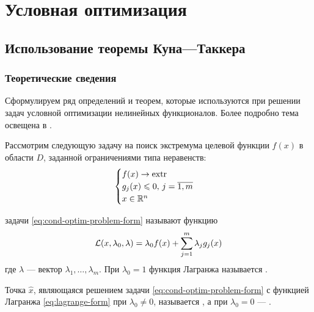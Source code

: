 \section{Условная оптимизация}

\subsection{Использование теоремы Куна—Таккера}
\label{sec:kuhn-tucker}

\subsubsection{Теоретические сведения}

Сформулируем ряд определений и теорем, которые используются при
решении задач условной оптимизации нелинейных функционалов. Более
подробно тема освещена в \cite{alekseev05}.

Рассмотрим следующую задачу на поиск экстремума целевой функции $f(x)$
в области $D$, заданной ограничениями типа неравенств:
\begin{equation}
  \label{eq:cond-optim-problem-form}
  \begin{cases}
    f(x) \to \operatorname{extr} \\
    g_j(x) \leqslant 0,\, j=\overline{1,m} \\
    x \in \mathbb{R}^n
  \end{cases}
\end{equation}

\begin{dfn}  задачи
  \eqref{eq:cond-optim-problem-form} называют функцию
  \begin{equation}
    \label{eq:lagrange-form}
    \mathcal{L}(x, \lambda_0, \lambda) = \lambda_0 f(x) + \sum_{j=1}^m {\lambda_j g_j(x)}
  \end{equation}
  где $\lambda$ — вектор $\lambda_1, \dotsc, \lambda_m$. При
  $\lambda_0=1$ функция Лагранжа называется .
\end{dfn}

\begin{dfn}
  \label{dfn:regular}
  Точка $\hat{x}$, являющаяся решением задачи
  \eqref{eq:cond-optim-problem-form} с функцией Лагранжа
  \eqref{eq:lagrange-form} при $\lambda_0 \neq 0$, называется
  , а при $\lambda_0 = 0$ —
  .
\end{dfn}

